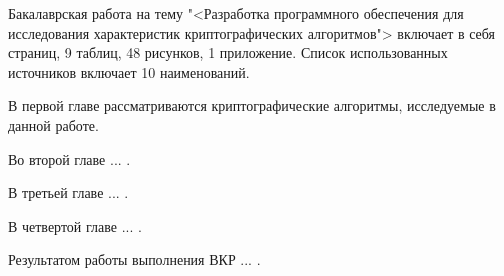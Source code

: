 \AtEndDocument{\label{lastpage}}

Бакалаврская работа на тему "<Разработка программного обеспечения для исследования характеристик
криптографических алгоритмов"> включает в себя \pageref{lastpage} страниц, 9 таблиц, 48 рисунков,
1 приложение. Список использованных источников включает 10 наименований.\par
В первой главе рассматриваются криптографические алгоритмы, исследуемые в данной работе.\par
Во второй главе ... .\par
В третьей главе ... .\par
В четвертой главе ... .\par
Результатом работы выполнения ВКР ... .\par